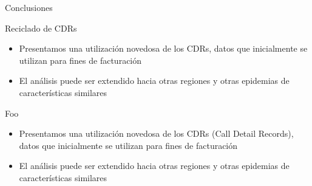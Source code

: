 \documentclass{beamer}
\begin{document}

\begin{frame}{Conclusiones}
	\begin{block}{Reciclado de CDRs }
		\begin{itemize}
			\item Presentamos una utilizaci\'on novedosa de los CDRs, datos que inicialmente se utilizan para fines de facturación
			\item El análisis puede ser extendido hacia otras regiones y otras epidemias de características similares
		\end{itemize}
	\end{block}

	\begin{block}{Foo}
		\begin{itemize}
			\item Presentamos una utilizaci\'on novedosa de los CDRs (Call Detail Records), datos que inicialmente se utilizan para fines de facturación
			\item El análisis puede ser extendido hacia otras regiones y otras epidemias de características similares
		\end{itemize}
	\end{block}

\end{frame}


%
%
%
\end{document}
